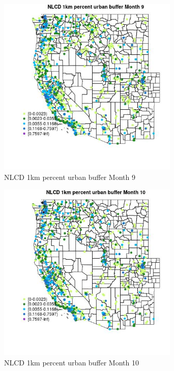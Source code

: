 \begin{figure} 
\centering  
\includegraphics[width=0.77\textwidth]{Code_Outputs/Report_ML_input_PM25_Step4_part_f_de_duplicated_aveswNAs_MapObsMo9NLCD_1km_percent_urban_buffer.jpg} 
\caption{\label{fig:Report_ML_input_PM25_Step4_part_f_de_duplicated_aveswNAsMapObsMo9NLCD_1km_percent_urban_buffer}NLCD 1km percent urban buffer Month 9} 
\end{figure} 
 

\begin{figure} 
\centering  
\includegraphics[width=0.77\textwidth]{Code_Outputs/Report_ML_input_PM25_Step4_part_f_de_duplicated_aveswNAs_MapObsMo10NLCD_1km_percent_urban_buffer.jpg} 
\caption{\label{fig:Report_ML_input_PM25_Step4_part_f_de_duplicated_aveswNAsMapObsMo10NLCD_1km_percent_urban_buffer}NLCD 1km percent urban buffer Month 10} 
\end{figure} 
 

